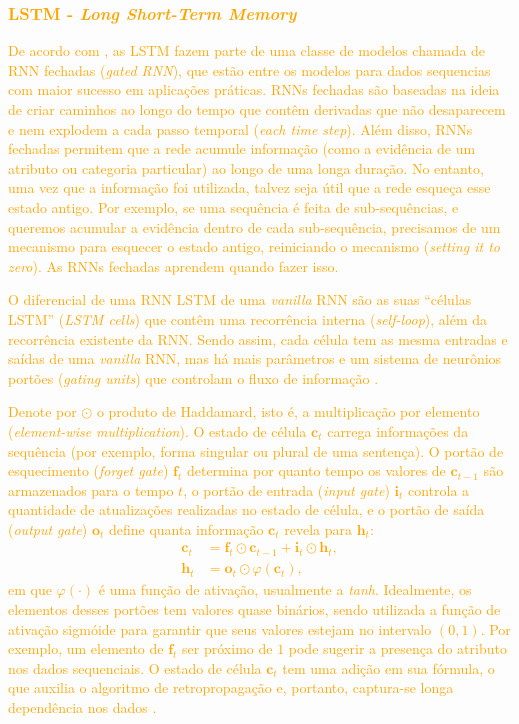 \documentclass{automatextcc}
\newcommand{\nico}[1]{\textcolor{orange}{#1}}
\newcommand{\bs}[1]{\boldsymbol{#1}}
\begin{document}
\subsubsection{\nico{LSTM - \textit{Long Short-Term Memory}}}

\nico{
De acordo com \citet{goodfellow2016}, as LSTM fazem parte de uma classe de modelos chamada de RNN fechadas (\textit{gated RNN}), que estão entre os modelos para dados sequencias com maior sucesso em aplicações práticas. RNNs fechadas são baseadas na ideia de criar caminhos ao longo do tempo que contêm derivadas que não desaparecem e nem explodem a cada passo temporal (\textit{each time step}). Além disso, RNNs fechadas permitem que a rede acumule informação (como a evidência de um atributo ou categoria particular) ao longo de uma longa duração. No entanto, uma vez que a informação foi utilizada, talvez seja útil que a rede esqueça esse estado antigo. Por exemplo, se uma sequência é feita de sub-sequências, e queremos acumular a evidência dentro de cada sub-sequência, precisamos de um mecanismo para esquecer o estado antigo, reiniciando o mecanismo (\textit{setting it to zero}). As RNNs fechadas aprendem quando fazer isso.
}

\nico{
O diferencial de uma RNN LSTM de uma \textit{vanilla} RNN são as suas ``células LSTM'' (\textit{LSTM cells}) que contêm uma recorrência interna (\textit{self-loop}), além da recorrência existente da RNN. Sendo assim, cada célula tem as mesma entradas e saídas de uma \textit{vanilla} RNN, mas há mais parâmetros e um sistema de neurônios portões (\textit{gating units}) que controlam o fluxo de informação \citep{goodfellow2016}.
}

\nico{
Denote por $\odot$ o produto de Haddamard, isto é, a multiplicação por elemento (\textit{element-wise multiplication}). O estado de célula $\bs{c}_t$ carrega informações da sequência (por exemplo, forma singular ou plural de uma sentença). O portão de esquecimento (\textit{forget gate}) $\bs{f}_t$ determina por quanto tempo os valores de $\bs{c}_{t-1}$ são armazenados para o tempo $t$, o portão de entrada (\textit{input gate}) $\bs{i}_t$ controla a quantidade de atualizações realizadas no estado de célula, e o portão de saída (\textit{output gate}) $\bs{o}_t$ define quanta informação $\bs{c}_t$ revela para $\bs{h}_t$:
\begin{align*}
    \bs{c}_{t} & = \bs{f}_{t} \odot \bs{c}_{t-1} + \bs{i}_{t} \odot \bs{h}_{t}, \\
    \bs{h}_{t} & = \bs{o}_{t} \odot \varphi(\bs{c}_{t}),
\end{align*}
em que $\varphi(\cdot)$ é uma função de ativação, usualmente a \textit{tanh}. Idealmente, os elementos desses portões tem valores quase binários, sendo utilizada a função de ativação sigmóide para garantir que seus valores estejam no intervalo $(0,1)$. Por exemplo, um elemento de $\bs{f}_t$ ser próximo de $1$ pode sugerir a presença do atributo nos dados sequenciais. O estado de célula $\bs{c}_t$ tem uma adição em sua fórmula, o que auxilia o algoritmo de retropropagação e, portanto, captura-se longa dependência nos dados \citep{goodfellow2016, fan2021}.
}
\end{document}
